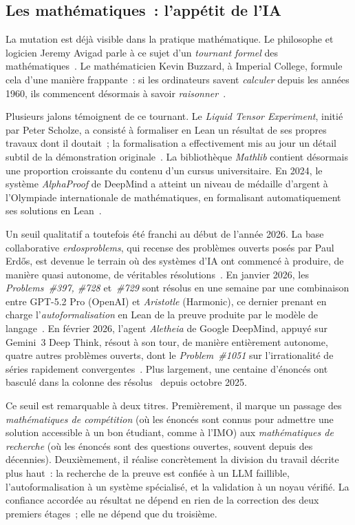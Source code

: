 \documentclass[11pt,a4paper]{article}
\begin{document}
\subsection{Les mathématiques~: l'appétit de l'IA}

La mutation est déjà visible dans la pratique mathématique. Le philosophe et logicien Jeremy Avigad parle à ce sujet d'un \emph{tournant formel} des mathématiques~\parencite{avigadMathematicsFormalTurn2023}. Le mathématicien Kevin Buzzard, à Imperial College, formule cela d'une manière frappante~: si les ordinateurs savent \emph{calculer} depuis les années 1960, ils commencent désormais à savoir \emph{raisonner}~\parencite{buzzardMathematicalReasoningComputer2025,leanlearningseminarProfessorKevinBuzzard2025}.

Plusieurs jalons témoignent de ce tournant. Le \emph{Liquid Tensor Experiment}, initié par Peter Scholze, a consisté à formaliser en Lean un résultat de ses propres travaux dont il doutait~; la formalisation a effectivement mis au jour un détail subtil de la démonstration originale~\parencite{scholze2021liquid}. La bibliothèque \emph{Mathlib} contient désormais une proportion croissante du contenu d'un cursus universitaire. En 2024, le système \emph{AlphaProof} de DeepMind a atteint un niveau de médaille d'argent à l'Olympiade internationale de mathématiques, en formalisant automatiquement ses solutions en Lean~\parencite{alphaproof2024}.

Un seuil qualitatif a toutefois été franchi au début de l'année 2026. La base collaborative \emph{erdosproblems}, qui recense des problèmes ouverts posés par Paul Erd\H{o}s, est devenue le terrain où des systèmes d'IA ont commencé à produire, de manière quasi autonome, de véritables résolutions~\parencite{erdosproblems}. En janvier 2026, les \emph{Problems~\#397, \#728} et~\emph{\#729} sont résolus en une semaine par une combinaison entre GPT-5.2 Pro (OpenAI) et \emph{Aristotle} (Harmonic), ce dernier prenant en charge l'\emph{autoformalisation} en Lean de la preuve produite par le modèle de langage~\parencite{aristotle2026erdos728}. En février 2026, l'agent \emph{Aletheia} de Google DeepMind, appuyé sur Gemini~3 Deep Think, résout à son tour, de manière entièrement autonome, quatre autres problèmes ouverts, dont le \emph{Problem~\#1051} sur l'irrationalité de séries rapidement convergentes~\parencite{deepmind2026aletheia}. Plus largement, une centaine d'énoncés ont basculé dans la colonne des \og résolus~\fg{} depuis octobre 2025.

Ce seuil est remarquable à deux titres. Premièrement, il marque un passage des \emph{mathématiques de compétition} (où les énoncés sont connus pour admettre une solution accessible à un bon étudiant, comme à l'IMO) aux \emph{mathématiques de recherche} (où les énoncés sont des questions ouvertes, souvent depuis des décennies). Deuxièmement, il réalise concrètement la division du travail décrite plus haut~: la recherche de la preuve est confiée à un LLM faillible, l'autoformalisation à un système spécialisé, et la validation à un noyau vérifié. La confiance accordée au résultat ne dépend en rien de la correction des deux premiers étages~; elle ne dépend que du troisième.
\end{document}
